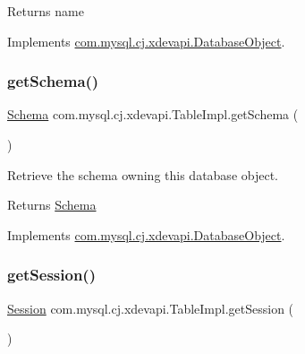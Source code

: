 \begin{DoxyReturn}{Returns}
name 
\end{DoxyReturn}


Implements \mbox{\hyperlink{interfacecom_1_1mysql_1_1cj_1_1xdevapi_1_1_database_object_a482b3ae6f40ec6332bb7d8d8d02d1dda}{com.\+mysql.\+cj.\+xdevapi.\+Database\+Object}}.

\mbox{\label{classcom_1_1mysql_1_1cj_1_1xdevapi_1_1_table_impl_a8aac02838d6b25aeeaaa53c4a34f4bac}} 
\subsubsection{\texorpdfstring{get\+Schema()}{getSchema()}}
{\footnotesize\ttfamily \mbox{\hyperlink{interfacecom_1_1mysql_1_1cj_1_1xdevapi_1_1_schema}{Schema}} com.\+mysql.\+cj.\+xdevapi.\+Table\+Impl.\+get\+Schema (\begin{DoxyParamCaption}{ }\end{DoxyParamCaption})}

Retrieve the schema owning this database object.

\begin{DoxyReturn}{Returns}
\mbox{\hyperlink{interfacecom_1_1mysql_1_1cj_1_1xdevapi_1_1_schema}{Schema}} 
\end{DoxyReturn}


Implements \mbox{\hyperlink{interfacecom_1_1mysql_1_1cj_1_1xdevapi_1_1_database_object_a2d3d1b87950c42ecbe557248c51c954b}{com.\+mysql.\+cj.\+xdevapi.\+Database\+Object}}.

\mbox{\label{classcom_1_1mysql_1_1cj_1_1xdevapi_1_1_table_impl_a50a4a5d8827aef7156fe6aa564f8809a}} 
\subsubsection{\texorpdfstring{get\+Session()}{getSession()}}
{\footnotesize\ttfamily \mbox{\hyperlink{interfacecom_1_1mysql_1_1cj_1_1xdevapi_1_1_session}{Session}} com.\+mysql.\+cj.\+xdevapi.\+Table\+Impl.\+get\+Session (\begin{DoxyParamCaption}{ }\end{DoxyParamCaption})}

